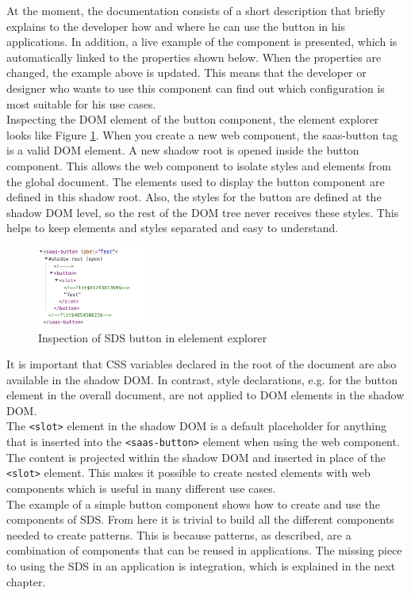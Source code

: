 At the moment, the documentation consists of a short description that briefly explains to the developer how and where he can use the button in his applications. In addition, a live example of the component is presented, which is automatically linked to the properties shown below. When the properties are changed, the example above is updated. This means that the developer or designer who wants to use this component can find out which configuration is most suitable for his use cases. \\
Inspecting the DOM element of the button component, the element explorer looks like Figure \ref{button_element_explorer}. When you create a new web component, the saas-button tag is a valid DOM element. A new shadow root is opened inside the button component. This allows the web component to isolate styles and elements from the global document. The elements used to display the button component are defined in this shadow root. Also, the styles for the button are defined at the shadow DOM level, so the rest of the DOM tree never receives these styles. This helps to keep elements and styles separated and easy to understand. \\
\begin{figure}[htbp]
    \centerline{\includegraphics[height=100px]{images/button_element_explorer.png}}
    \caption{Inspection of \ac{SDS} button in elelement explorer}
    \label{button_element_explorer}
\end{figure}
It is important that CSS variables declared in the root of the document are also available in the shadow DOM. In contrast, style declarations, e.g. for the button element in the overall document, are not applied to DOM elements in the shadow DOM. \\
The \texttt{<slot>} element in the shadow DOM is a default placeholder for anything that is inserted into the \texttt{<saas-button>} element when using the web component. The content is projected within the shadow DOM and inserted in place of the \texttt{<slot>} element. This makes it possible to create nested elements with web components which is useful in many different use cases. \\

The example of a simple button component shows how to create and use the components of \ac{SDS}. From here it is trivial to build all the different components needed to create patterns. This is because patterns, as described, are a combination of components that can be reused in applications. The missing piece to using the \ac{SDS} in an application is integration, which is explained in the next chapter.